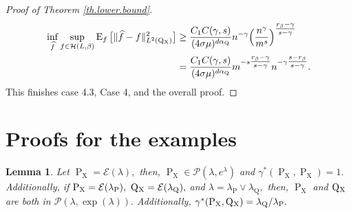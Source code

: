 \documentclass[10pt]{article}
\newcommand{\mE}{\mathcal{E}}
\newcommand{\mH}{\mathcal{H}}
\newcommand{\mP}{\mathcal{P}}
\newcommand{\E}{\operatorname{E}}
\renewcommand{\P}{\operatorname{P}}
\newcommand{\Q}{\operatorname{Q}}
\newcommand{\wh}{\widehat}
\newcommand{\sX}{\mathrm{X}}
\newtheorem{lemma}[theorem]{Lemma}
\begin{document}
\begin{proof}[Proof of Theorem \ref{th.lower.bound}]
    \begin{align*}
        \inf_{\wh f} \sup_{f \in \mH(L, \beta)}\E_{f}\big[\|\wh f - f\|_{L^2(\Q\mathstrut_{\!\sX})}^2\big] &\geq \frac{C_1 C(\gamma, s)}{(4\sigma\mu)^{d\alpha_{\Q}}}n^{-\gamma}\Big(\frac{n^\gamma}{m^s}\Big)^{\tfrac{r_\beta - \gamma}{s - \gamma}}\\
        &= \frac{C_1 C(\gamma, s)}{(4\sigma\mu)^{d\alpha_{\Q}}}m^{-s\tfrac{r_\beta - \gamma}{s - \gamma}}n^{-\gamma\tfrac{s - r_\beta}{s - \gamma}}.
    \end{align*}
    This finishes case 4.3, Case 4, and the overall proof.
\end{proof}




\section{Proofs for the examples}
\label{app.examples}
\begin{lemma}
    \label{lem.example.exponential}
    Let $\P_{\sX}  = \mE(\lambda),$ then, $\P_{\sX} \in \mP(\lambda, e^\lambda)$ and $\gamma^*(\P_{\sX}, \P_{\sX}) = 1.$ Additionally, if $\P_{\sX} = \mE(\lambda_{\P}), \ \Q\mathstrut_{\!\sX} = \mE(\lambda_{\Q}),$ and $\lambda = \lambda_{\P} \vee \lambda_{\Q},$ then, $\P_{\sX}$ and $\Q\mathstrut_{\!\sX}$ are both in $\mP(\lambda, \exp(\lambda)).$ Additionally, $\gamma^{*}(\P_{\sX}, \Q\mathstrut_{\!\sX}) = \lambda_{\Q}/\lambda_{\P}.$
\end{lemma}
\end{document}

